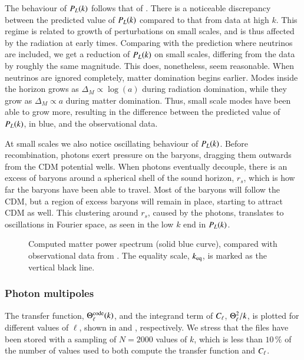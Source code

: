 The behaviour of $P_L(k)$ follows that of . There is a noticeable discrepancy between the predicted value of $P_L(k)$ compared to that from data at high $k$. This regime is related to growth of perturbations on small scales, and is thus affected by the radiation at early times. Comparing with the prediction where neutrinos are included, we get a reduction of $P_L(k)$ on small scales, differing from the data by roughly the same magnitude. This does, nonetheless, seem reasonable. When neutrinos are ignored completely, matter domination begins earlier. Modes inside the horizon grows as $\Delta_M\propto\log(a)$ during radiation domination, while they grow as $\Delta_M\propto a$ during matter domination. Thus, small scale modes have been able to grow more, resulting in the difference between the predicted value of $P_L(k)$, in blue, and the observational data. 

At small scales we also notice oscillating behaviour of $P_L(k)$. Before recombination, photons exert pressure on the baryons, dragging them outwards from the CDM potential wells. When photons eventually decouple, there is an excess of baryons around a spherical shell of the sound horizon, $r_s$, which is how far the baryons have been able to travel. Most of the baryons will follow the CDM, but a region of excess baryons will remain in place, starting to attract CDM as well. This clustering around $r_s$, caused by the photons, translates to oscillations in Fourier space, as seen in the low $k$ end in $P_L(k)$. 
\begin{figure}[ht!]
    \caption{Computed matter power spectrum (solid blue curve), compared with observational data from . The equality scale, $k_\mathrm{eq}$, is marked as the vertical black line.}
    \label{fig:M4:results:matterPS_nk2000Neff}
\end{figure}





\subsubsection{Photon multipoles} \label{sssec:M4:results:photons_multipoles}
The transfer function, $\Theta_\ell^\mathrm{code}(k)$, and the integrand term of $C_\ell$, $\Theta_\ell^2/k$, is plotted for different values of $\ell$, shown in  and , respectively. We stress that the files have been stored with a sampling of $N=2000$ values of $k$, which is less than $10\,\%$ of the number of values used to both compute the transfer function and $C_\ell$.  

